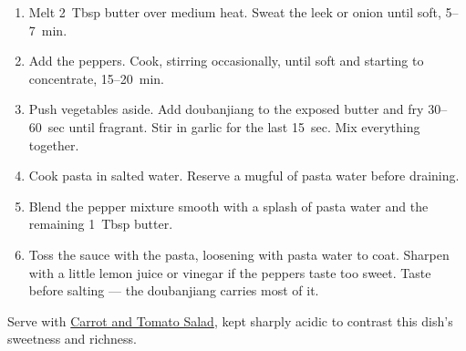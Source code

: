 \label{pasta-poivron-doubanjiang}

\begin{ingredients}
\end{ingredients}


\begin{recipe}
  \begin{enumerate}

  \item Melt 2~Tbsp butter over medium heat.  Sweat the leek or onion
    until soft, 5--7~min.

  \item Add the peppers.  Cook, stirring occasionally, until soft and
    starting to concentrate, 15--20~min.

  \item Push vegetables aside.  Add doubanjiang to the exposed
    butter and fry 30--60~sec until fragrant.  Stir in garlic for
    the last 15~sec.  Mix everything together.

  \item Cook pasta in salted water.  Reserve a mugful of pasta
    water before draining.

  \item Blend the pepper mixture smooth with a splash of pasta
    water and the remaining 1~Tbsp butter.

  \item Toss the sauce with the pasta, loosening with pasta water
    to coat.  Sharpen with a little lemon juice or vinegar if the
    peppers taste too sweet.  Taste before salting --- the
    doubanjiang carries most of it.

  \end{enumerate}
\end{recipe}

\notes{} Serve with \hyperref[carrot-tomato-vinaigrette]{Carrot and
  Tomato Salad}, kept sharply acidic to contrast this dish's sweetness
and richness.
